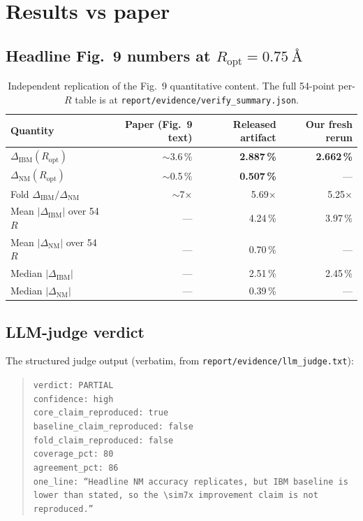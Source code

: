 \documentclass[11pt]{article}
\begin{document}
\section{Results vs paper}
\label{sec:results}

\subsection{Headline Fig.~9 numbers at $R_{\mathrm{opt}} = \SI{0.75}{\angstrom}$}
\begin{table}[h]
\centering
\begin{tabular}{@{}lrrr@{}}
\toprule
Quantity & Paper (Fig.~9 text) & Released artifact & Our fresh rerun \\
\midrule
$\Delta_{\mathrm{IBM}}(R_{\mathrm{opt}})$ & $\sim$3.6\,\% & \textbf{2.887\,\%} & \textbf{2.662\,\%} \\
$\Delta_{\mathrm{NM}}(R_{\mathrm{opt}})$  & $\sim$0.5\,\% & \textbf{0.507\,\%} & --- \\
Fold $\Delta_{\mathrm{IBM}}/\Delta_{\mathrm{NM}}$ & $\sim$7$\times$ & 5.69$\times$ & 5.25$\times$ \\
\midrule
Mean $|\Delta_{\mathrm{IBM}}|$ over 54 $R$ & --- & 4.24\,\% & 3.97\,\% \\
Mean $|\Delta_{\mathrm{NM}}|$ over 54 $R$  & --- & 0.70\,\% & --- \\
Median $|\Delta_{\mathrm{IBM}}|$          & --- & 2.51\,\% & 2.45\,\% \\
Median $|\Delta_{\mathrm{NM}}|$           & --- & 0.39\,\% & --- \\
\bottomrule
\end{tabular}
\caption{Independent replication of the Fig.~9 quantitative content. The full 54-point per-$R$ table is at \texttt{report/evidence/verify\_summary.json}.}
\end{table}

\subsection{LLM-judge verdict}
The structured judge output (verbatim, from \texttt{report/evidence/llm\_judge.txt}):
\begin{quote}\small
\texttt{verdict: PARTIAL}\\
\texttt{confidence: high}\\
\texttt{core\_claim\_reproduced: true}\\
\texttt{baseline\_claim\_reproduced: false}\\
\texttt{fold\_claim\_reproduced: false}\\
\texttt{coverage\_pct: 80}\\
\texttt{agreement\_pct: 86}\\
\texttt{one\_line: ``Headline NM accuracy replicates, but IBM baseline is lower than stated, so the $\sim$7x improvement claim is not reproduced.''}
\end{quote}
\end{document}
